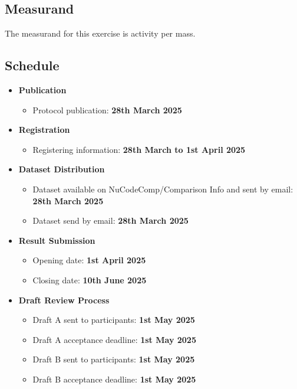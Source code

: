 \documentclass[12pt]{iopart}
\begin{document}
\subsection{Measurand}

The measurand for this exercise is activity per mass.

\subsection{Schedule}

\begin{itemize}[leftmargin=2em, label={}]  %
  \item \textbf{Publication}
  \begin{itemize}[leftmargin=3em]
    \item Protocol publication: \textbf{28th March 2025}
  \end{itemize}

  \item \textbf{Registration}
  \begin{itemize}[leftmargin=3em]
    \item Registering information: \textbf{28th March to 1st April 2025}
  \end{itemize}

  \item \textbf{Dataset Distribution}
  \begin{itemize}[leftmargin=3em]
    \item Dataset available on NuCodeComp/Comparison Info and sent by email: \textbf{28th March 2025}
    \item Dataset send by email: \textbf{28th March 2025}
  \end{itemize}

  \item \textbf{Result Submission}
  \begin{itemize}[leftmargin=3em]
    \item Opening date: \textbf{1st April 2025}
    \item Closing date: \textbf{10th June 2025}
  \end{itemize}

  \item \textbf{Draft Review Process}
  \begin{itemize}[leftmargin=3em]
    \item Draft A sent to participants: \textbf{1st May 2025}
    \item Draft A acceptance deadline: \textbf{1st May 2025}
    \item Draft B sent to participants: \textbf{1st May 2025}
    \item Draft B acceptance deadline: \textbf{1st May 2025}
  \end{itemize}
\end{itemize}
\end{document}
